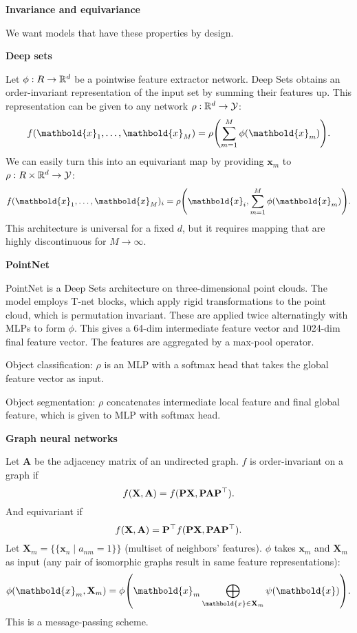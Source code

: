 \documentclass[10pt]{article}
\newenvironment{topic}[1]
{\textbf{\sffamily \footnotesize \colorbox{black}{\rlap{\textbf{\textcolor{white}{#1}}}\hspace{\linewidth}\hspace{-2\fboxsep}}}}
{}
\newenvironment{subtopic}[1]
{\vspace{0.1cm} \begin{center}\textbf{\footnotesize \sffamily #1}\end{center}}
{}
\renewcommand{\mat}[1]{\ensuremath{\mathbf{#1}}}
\renewcommand{\vec}[1]{\ensuremath{\mathbold{#1}}}
\begin{document}
\begin{multicols*}{3}
\begin{topic}{Geometric deep learning}
\begin{subtopic}{Invariance and equivariance}
            We want models that have these properties by design.
        \end{subtopic}

        \begin{subtopic}{Deep sets}
            Let $\phi: R \to \mathbb{R}^d$ be a pointwise feature extractor network. Deep Sets obtains an
            order-invariant representation of the input set by summing their features up. This
            representation can be given to any network $\rho: \mathbb{R}^d \to \mathcal{Y}$: \[
                f(\vec{x}_1, \ldots, \vec{x}_M) = \rho \lft( \sum_{m=1}^{M} \phi(\vec{x}_m) \rgt).
            \]
            We can easily turn this into an equivariant map by providing $\vec{x}_m$ to $\rho: R \times \mathbb{R}^d
                \to \mathcal{Y}$: \[
                f(\vec{x}_1, \ldots, \vec{x}_M)_i = \rho \lft( \vec{x}_i, \sum_{m=1}^{M} \phi(\vec{x}_m) \rgt).
            \]
            This architecture is universal for a fixed $d$, but it requires mapping that are highly
            discontinuous for $M \to \infty$.
        \end{subtopic}

        \begin{subtopic}{PointNet}
            PointNet is a Deep Sets architecture on three-dimensional point clouds. The model employs
            T-net blocks, which apply rigid transformations to the point cloud, which is permutation
            invariant. These are applied twice alternatingly with MLPs to form $\phi$. This gives a
            64-dim intermediate feature vector and 1024-dim final feature vector. The features are
            aggregated by a max-pool operator.

            Object classification: $\rho$ is an MLP with a softmax head that takes the global feature vector as
            input.

            Object segmentation: $\rho$ concatenates intermediate local feature and final global feature, which
            is given to MLP with softmax head.
        \end{subtopic}

        \begin{subtopic}{Graph neural networks}
            Let $\mat{A}$ be the adjacency matrix of an undirected graph. $f$ is order-invariant on a graph if \[
                f(\mat{X},\mat{A}) = f(\mat{P}\mat{X}, \mat{P}\mat{A}\transpose{\mat{P}}).
            \]
            And equivariant if \[
                f(\mat{X}, \mat{A}) = \transpose{\mat{P}} f(\mat{P}\mat{X},\mat{P}\mat{A}\transpose{\mat{P}}).
            \]
            Let $\mat{X}_m = \{ \{ \vec{x}_n \mid a_{nm} = 1 \} \}$ (multiset of neighbors' features). $\phi$
            takes $\vec{x}_m$ and $\mat{X}_m$ as input (any pair of isomorphic graphs result in same feature
            representations): \[
                \phi(\vec{x}_m, \mat{X}_m) = \phi \lft( \vec{x}_m \bigoplus_{\vec{x} \in \mat{X}_m} \psi(\vec{x}) \rgt).
            \]
            This is a message-passing scheme.


\end{subtopic}
\end{topic}
\end{multicols*}
\end{document}
